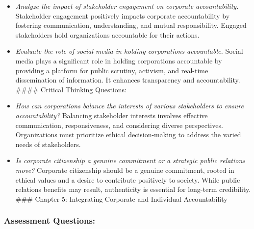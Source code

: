 \documentclass[
  letterpaper,
  DIV=11,
  numbers=noendperiod]{scrreprt}
\begin{document}
\begin{itemize}
\item
  \emph{Analyze the impact of stakeholder engagement on corporate
  accountability.} Stakeholder engagement positively impacts corporate
  accountability by fostering communication, understanding, and mutual
  responsibility. Engaged stakeholders hold organizations accountable
  for their actions.
\item
  \emph{Evaluate the role of social media in holding corporations
  accountable.} Social media plays a significant role in holding
  corporations accountable by providing a platform for public scrutiny,
  activism, and real-time dissemination of information. It enhances
  transparency and accountability. \#\#\#\# Critical Thinking Questions:
\item
  \emph{How can corporations balance the interests of various
  stakeholders to ensure accountability?} Balancing stakeholder
  interests involves effective communication, responsiveness, and
  considering diverse perspectives. Organizations must prioritize
  ethical decision-making to address the varied needs of stakeholders.
\item
  \emph{Is corporate citizenship a genuine commitment or a strategic
  public relations move?} Corporate citizenship should be a genuine
  commitment, rooted in ethical values and a desire to contribute
  positively to society. While public relations benefits may result,
  authenticity is essential for long-term credibility. \#\#\# Chapter 5:
  Integrating Corporate and Individual Accountability
\end{itemize}

\subsubsection{Assessment Questions:}\label{assessment-questions-12}
\end{document}
